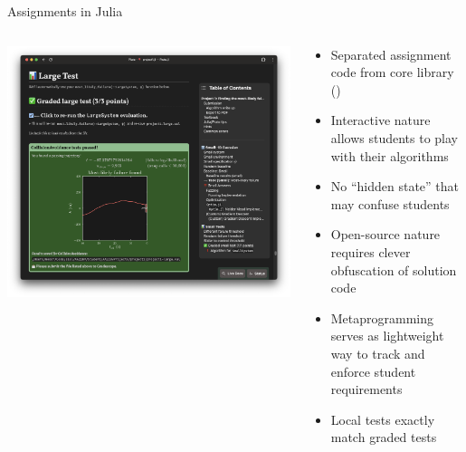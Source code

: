 \begin{frame}[fragile]{Assignments in Julia}

\begin{columns}
  \hfill
  \begin{column}{0.45\textwidth}
    \centering
    \includegraphics[width=\linewidth]{media/project1.png}

  \end{column}
  \pause
  \begin{column}{0.54\textwidth}
    \small
    \begin{itemize}
      \item Separated assignment code from core library () \pause
      \item Interactive nature allows students to play with their algorithms \pause
      \item No ``hidden state'' that may confuse students \pause
      \item Open-source nature requires clever obfuscation of solution code \pause
      \item Metaprogramming serves as lightweight way to track and enforce student requirements \pause
      \item Local tests exactly match graded tests \pause
    \end{itemize}
  \end{column}
  \hfill
\end{columns}

\end{frame}